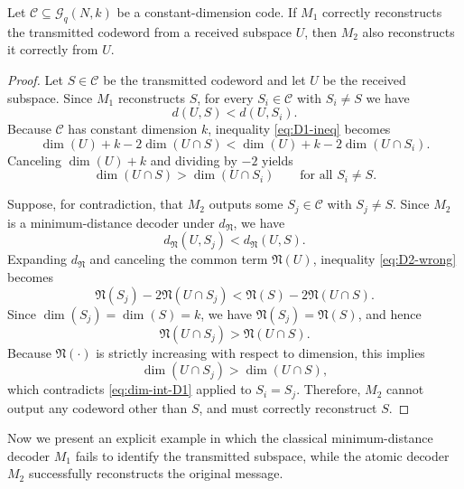 \documentclass{svproc}
\begin{document}
\begin{proposition}\label{prop:M1-implies-M2}
Let $\mathcal C \subseteq \mathcal G_q(N,k)$ be a constant-dimension code.
If $M_1$ correctly reconstructs the transmitted codeword from a received
subspace $U$, then $M_2$ also reconstructs it correctly from $U$.
\end{proposition}

\begin{proof}
Let $S\in\mathcal C$ be the transmitted codeword and let $U$ be the received
subspace. Since $M_1$ reconstructs $S$, for every $S_i\in\mathcal C$ with
$S_i\neq S$ we have
\begin{equation}\label{eq:D1-ineq}
d(U,S) < d(U,S_i).
\end{equation}
Because $\mathcal C$ has constant dimension $k$, inequality
\eqref{eq:D1-ineq} becomes
\[
\dim(U)+k-2\dim(U\cap S)
<
\dim(U)+k-2\dim(U\cap S_i).
\]
Canceling $\dim(U)+k$ and dividing by $-2$ yields
\begin{equation}\label{eq:dim-int-D1}
\dim(U\cap S) > \dim(U\cap S_i)
\qquad\text{for all } S_i\neq S.
\end{equation}

Suppose, for contradiction, that $M_2$ outputs some $S_j\in\mathcal C$ with
$S_j\neq S$. Since $M_2$ is a minimum-distance decoder under $d_{\mathfrak N}$,
we have
\begin{equation}\label{eq:D2-wrong}
d_{\mathfrak N}(U,S_j) < d_{\mathfrak N}(U,S).
\end{equation}
Expanding $d_{\mathfrak N}$ and canceling the common term $\mathfrak N(U)$,
inequality \eqref{eq:D2-wrong} becomes
\[
\mathfrak N(S_j)-2\mathfrak N(U\cap S_j)
<
\mathfrak N(S)-2\mathfrak N(U\cap S).
\]
Since $\dim(S_j)=\dim(S)=k$, we have $\mathfrak N(S_j)=\mathfrak N(S)$, and
hence
\[
\mathfrak N(U\cap S_j) > \mathfrak N(U\cap S).
\]
Because $\mathfrak N(\cdot)$ is strictly increasing with respect to dimension,
this implies
\begin{equation}\label{eq:dim-int-D2}
\dim(U\cap S_j) > \dim(U\cap S),
\end{equation}
which contradicts \eqref{eq:dim-int-D1} applied to $S_i=S_j$. Therefore, $M_2$
cannot output any codeword other than $S$, and must correctly reconstruct $S$.
\end{proof}

Now we present an explicit example in which the classical minimum-distance decoder $M_1$ fails to identify the transmitted subspace, while the atomic decoder $M_2$ successfully reconstructs the original message.
\end{document}
